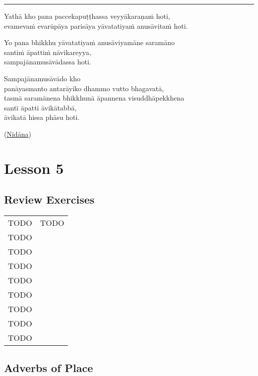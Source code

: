 \documentclass[11pt,oneside]{memoir}
\begin{document}
\noindent\rule{\textwidth}{0.5pt}

Yathā kho pana paccekapuṭṭhassa veyyākaraṇaṁ hoti, \\[0pt]
evamevaṁ evarūpāya parisāya yāvatatiyaṁ anusāvitaṁ hoti.

Yo pana bhikkhu yāvatatiyaṁ anusāviyamāne saramāno \\[0pt]
santiṁ āpattiṁ nāvikareyya, \\[0pt]
sampajānamusāvādassa hoti.

Sampajānamusāvādo kho \\[0pt]
panāyasmanto antarāyiko dhammo vutto bhagavatā, \\[0pt]
tasmā saramānena bhikkhunā āpannena visuddhāpekkhena \\[0pt]
santī āpatti āvikātabbā, \\[0pt]
āvikatā hissa phāsu hoti.

(\href{https://suttacentral.net/pli-tv-bu-pm/pli/ms}{Nidāna})

\chapter{Lesson 5}
\label{sec:org702960e}
\section{Review Exercises}
\label{sec:org4aafe00}

\renewcommand{\arraystretch}{1.8}

\begin{center}
\begin{tabular}{ll}
TODO & TODO\\[0pt]
TODO & \\[0pt]
TODO & \\[0pt]
TODO & \\[0pt]
TODO & \\[0pt]
TODO & \\[0pt]
TODO & \\[0pt]
TODO & \\[0pt]
TODO & \\[0pt]
\end{tabular}
\end{center}

\normalArrayStrech

\section{Adverbs of Place}
\label{sec:orgc1f8c63}
\end{document}
